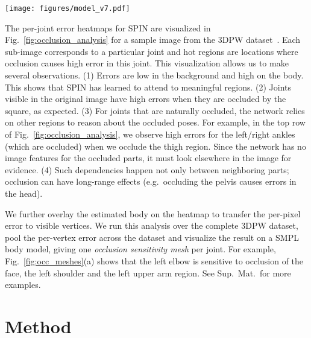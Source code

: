 \documentclass[10pt,twocolumn,letterpaper,usenames,dvipsnames]{article}
\newcommand{\methodname}{PARE\xspace}
\newcommand{\figref}[1]{Fig.~\ref{#1}}
\newcommand{\supmat}{Sup.~Mat.\xspace}
\begin{document}
\begin{figure*}[h]
	\centerline{
		\texttt{[image: figures/model\_v7.pdf]}}
	\caption{\textbf{{\methodname} model architecture.} 
		Given an input image, {\methodname} extracts two pixel-level features $P$ and $F$, which are fused by part attention (green box) leading to the final feature $F^\prime$ for camera and SMPL body regression.
	}
	\label{fig:model}
	\vspace{-2ex}
\end{figure*}{}

The per-joint error heatmaps for SPIN are visualized in \figref{fig:occlusion_analysis} for a sample image from the 3DPW dataset~\cite{vonMarcard2018_3dpw}.
Each sub-image corresponds to a particular joint and hot regions are locations where occlusion causes high error in this joint.  
This visualization allows us to make several observations.
(1) Errors are low in the background and high on the body. This shows that SPIN has learned to attend to meaningful regions.
(2) Joints visible in the original image have high errors when they are occluded by the square, as expected.
(3) For joints that are naturally occluded, the network relies on other regions to reason about the occluded poses. 
For example, in the top row of Fig.~\ref{fig:occlusion_analysis}, we observe high errors for the left/right ankles (which are occluded) when we occlude the thigh region.
Since the network has no image features for the occluded parts, it must look elsewhere in the image for evidence.
(4) Such dependencies happen not only between neighboring parts; occlusion can have long-range effects (e.g.~occluding the pelvis causes errors in the head). 

We further overlay the estimated body on the heatmap to transfer the per-pixel error to visible vertices.
We run this analysis over the complete 3DPW dataset, pool the per-vertex error across the dataset and visualize the result on a SMPL body model, giving one \emph{occlusion sensitivity mesh} per joint.
For example, Fig.~\ref{fig:occ_meshes}(a) shows that the left elbow is sensitive to occlusion of the face, the left shoulder and the left upper arm region. See \supmat~for more examples. \section{Method}
\label{methods}
\end{document}
